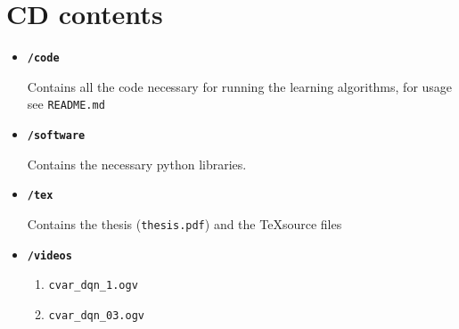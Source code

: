 \chapter{CD contents}
\begin{itemize}
\item \texttt{\textbf{/code}}

Contains all the code necessary for running the learning algorithms, for usage see \texttt{README.md}

\item \texttt{\textbf{/software}}

Contains the necessary python libraries.
\item \texttt{\textbf{/tex}}


Contains the thesis (\texttt{thesis.pdf}) and the \TeX source files
\item \texttt{\textbf{/videos}}
\begin{enumerate}
\item \texttt{cvar\_dqn\_1.ogv} \label{video:1}
\item \texttt{cvar\_dqn\_03.ogv} \label{video:03}
\end{enumerate}
\end{itemize}